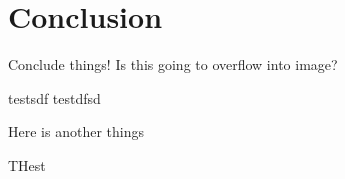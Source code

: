 \section{Conclusion}\label{sec:conclusion}
Conclude things!
Is this going to overflow into image?


testsdf
testdfsd

Here is another things

THest
